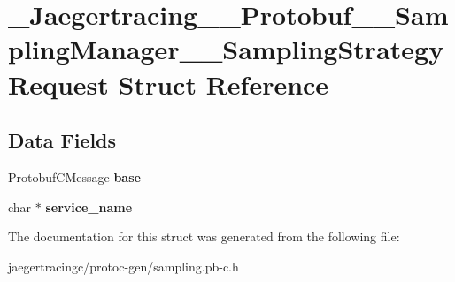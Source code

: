 \hypertarget{struct__Jaegertracing____Protobuf____SamplingManager____SamplingStrategyRequest}{}\section{\+\_\+\+Jaegertracing\+\_\+\+\_\+\+Protobuf\+\_\+\+\_\+\+Sampling\+Manager\+\_\+\+\_\+\+Sampling\+Strategy\+Request Struct Reference}
\label{struct__Jaegertracing____Protobuf____SamplingManager____SamplingStrategyRequest}
\subsection*{Data Fields}
\begin{DoxyCompactItemize}
\item 
\mbox{\label{struct__Jaegertracing____Protobuf____SamplingManager____SamplingStrategyRequest_ae56c67a98c43e9b6e03a58e6cdd88467}} 
Protobuf\+C\+Message {\bfseries base}
\item 
\mbox{\label{struct__Jaegertracing____Protobuf____SamplingManager____SamplingStrategyRequest_a854b0e0744b64ce1197ba7dbe5e7c48c}} 
char $\ast$ {\bfseries service\+\_\+name}
\end{DoxyCompactItemize}


The documentation for this struct was generated from the following file\+:\begin{DoxyCompactItemize}
\item 
jaegertracingc/protoc-\/gen/sampling.\+pb-\/c.\+h\end{DoxyCompactItemize}
